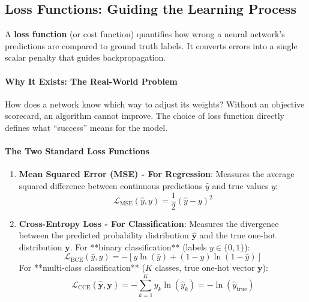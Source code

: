 \subsection{Loss Functions: Guiding the Learning Process}

\begin{keyidea}
A \textbf{loss function} (or cost function) quantifies how wrong a neural network's predictions are compared to ground truth labels. It converts errors into a single scalar penalty that guides backpropagation.
\end{keyidea}

\paragraph{Why It Exists: The Real-World Problem}
How does a network know which way to adjust its weights? Without an objective scorecard, an algorithm cannot improve. The choice of loss function directly defines what ``success'' means for the model.

\paragraph{The Two Standard Loss Functions}
\begin{enumerate}
    \item \textbf{Mean Squared Error (MSE) - For Regression}:
    Measures the average squared difference between continuous predictions $\hat{y}$ and true values $y$:
    \begin{equation}
    \mathcal{L}_{\text{MSE}}(\hat{y}, y) = \frac{1}{2}(\hat{y} - y)^2\label{eq:mse_loss_nn}
    \end{equation}

    \item \textbf{Cross-Entropy Loss - For Classification}:
    Measures the divergence between the predicted probability distribution $\hat{\mathbf{y}}$ and the true one-hot distribution $\mathbf{y}$.
    For **binary classification** (labels $y \in \{0, 1\}$):
    \begin{equation}
    \mathcal{L}_{\text{BCE}}(\hat{y}, y) = -\left[ y \ln(\hat{y}) + (1 - y) \ln(1 - \hat{y}) \right]\label{eq:bce_loss}
    \end{equation}
    For **multi-class classification** ($K$ classes, true one-hot vector $\mathbf{y}$):
    \begin{equation}
    \mathcal{L}_{\text{CCE}}(\hat{\mathbf{y}}, \mathbf{y}) = -\sum_{k=1}^K y_k \ln(\hat{y}_k) = -\ln(\hat{y}_{\text{true}})\label{eq:cce_loss}
    \end{equation}
\end{enumerate}

